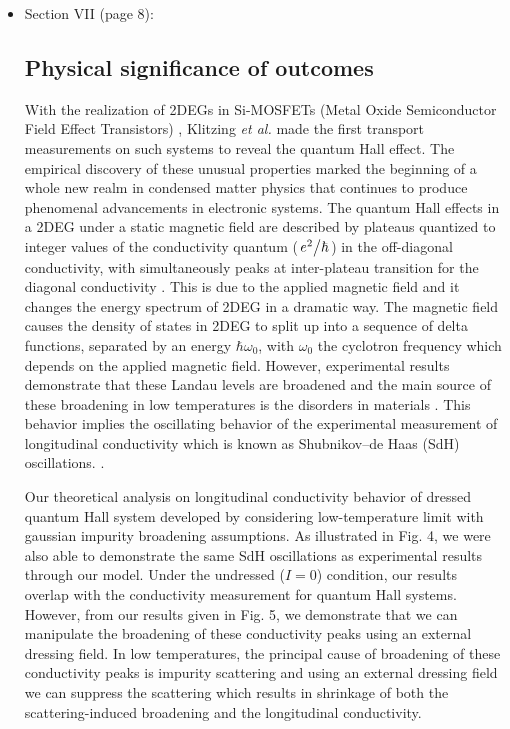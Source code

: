 \documentclass{article}
\begin{document}
\begin{itemize}
  \item Section VII (page 8):\\
  {\color{Maroon}
  \subsection*{Physical significance of outcomes}

  With the realization of 2DEGs in Si-MOSFETs (Metal Oxide Semiconductor Field Effect Transistors) \cite{fowler66}, Klitzing \textit{et al.} \cite{klitzing80} made the first transport measurements on such systems to reveal the quantum Hall effect. The empirical discovery of these unusual properties marked the beginning of a whole new realm in condensed matter physics that continues to produce phenomenal advancements in electronic systems. The quantum Hall effects in a 2DEG under a static magnetic field are described by plateaus quantized to integer values of the conductivity quantum ($\flatfrac{e^2}{\hbar}$) in the off-diagonal conductivity, with simultaneously peaks at inter-plateau transition for the diagonal conductivity \cite{endo09}. This is due to the applied magnetic field and it changes the energy spectrum of 2DEG in a dramatic way. The magnetic field causes the density of states in 2DEG to split up into a sequence of delta functions, separated by an energy $\hbar\omega_0$, with $\omega_0$ the cyclotron frequency which depends on the applied magnetic field.
  However, experimental results demonstrate that these Landau levels are broadened and the main source of these broadening in low temperatures is the disorders in materials \cite{ando85,dial07}. This behavior implies the oscillating behavior of the experimental measurement of longitudinal conductivity which is known as Shubnikov–de Haas (SdH) oscillations. \cite{endo09,wakabayashi78}.

  Our theoretical analysis on longitudinal conductivity behavior of dressed quantum Hall system developed by considering low-temperature limit with gaussian impurity broadening assumptions. As illustrated in Fig. 4, we were also able to demonstrate the same SdH oscillations as experimental results \cite{endo09,wakabayashi78} through our model. Under the undressed ($I=0$) condition, our results overlap with the conductivity measurement for quantum Hall systems. However, from our results given in Fig. 5, we demonstrate that we can manipulate the broadening of these conductivity peaks using an external dressing field. In low temperatures, the principal cause of broadening of these conductivity peaks is impurity scattering and using an external dressing field we can suppress the scattering which results in shrinkage of both the scattering-induced broadening and the longitudinal conductivity.

}
\end{itemize}
\end{document}
